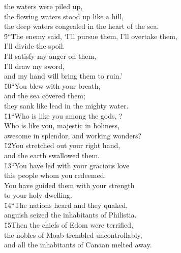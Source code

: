 \begin{poetry}
\poemll    the waters were piled up, \\
\poeml the flowing waters stood up like a hill, \\
\poemll    the deep waters congealed in the heart of the sea. \\
\poeml \v{9}``The enemy said, `I'll pursue them, I'll overtake them, \\
\poemll    I'll divide the spoil. \\
\poeml I'll satisfy my anger on them, \\
\poemll    I'll draw my sword, \\
\poemlll       and my hand will bring them to ruin.' \\
\poeml \v{10}``You blew with your breath, \\
\poemll    and the sea covered them; \\
\poemlll       they sank like lead in the mighty water. \\
\poeml \v{11}``Who is like you among the gods, ? \\
\poemll    Who is like you, majestic in holiness, \\
\poemlll       awesome in splendor, and working wonders? \\
\poeml \v{12}You stretched out your right hand, \\
\poemll    and the earth swallowed them. \\
\poeml \v{13}``You have led with your gracious love \\
\poemll    this people whom you redeemed. \\
\poeml You have guided them with your strength \\
\poemll    to your holy dwelling. \\
\poeml \v{14}``The nations heard and they quaked, \\
\poemll    anguish seized the inhabitants of Philistia. \\
\poeml \v{15}Then the chiefs of Edom were terrified, \\
\poemll    the nobles of Moab trembled uncontrollably, \\
\poemlll       and all the inhabitants of Canaan melted away. \\

\end{poetry}
